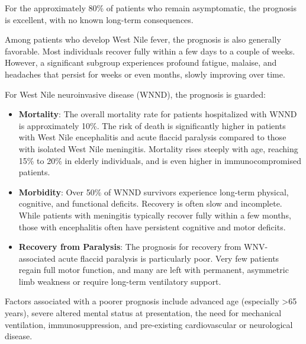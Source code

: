 For the approximately 80\% of patients who remain asymptomatic, the prognosis is excellent, with no known long-term consequences.

Among patients who develop West Nile fever, the prognosis is also generally favorable. Most individuals recover fully within a few days to a couple of weeks. However, a significant subgroup experiences profound fatigue, malaise, and headaches that persist for weeks or even months, slowly improving over time.

For West Nile neuroinvasive disease (WNND), the prognosis is guarded:
\begin{itemize}
    \item \textbf{Mortality}: The overall mortality rate for patients hospitalized with WNND is approximately 10\%. The risk of death is significantly higher in patients with West Nile encephalitis and acute flaccid paralysis compared to those with isolated West Nile meningitis. Mortality rises steeply with age, reaching 15\% to 20\% in elderly individuals, and is even higher in immunocompromised patients.
    \item \textbf{Morbidity}: Over 50\% of WNND survivors experience long-term physical, cognitive, and functional deficits. Recovery is often slow and incomplete. While patients with meningitis typically recover fully within a few months, those with encephalitis often have persistent cognitive and motor deficits.
    \item \textbf{Recovery from Paralysis}: The prognosis for recovery from WNV-associated acute flaccid paralysis is particularly poor. Very few patients regain full motor function, and many are left with permanent, asymmetric limb weakness or require long-term ventilatory support.
\end{itemize}
Factors associated with a poorer prognosis include advanced age (especially >65 years), severe altered mental status at presentation, the need for mechanical ventilation, immunosuppression, and pre-existing cardiovascular or neurological disease.

